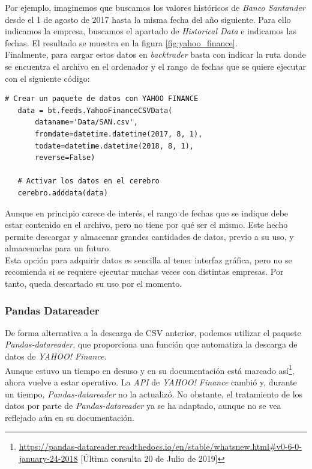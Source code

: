 		Por ejemplo, imaginemos que buscamos los valores hist\'oricos de \textit{Banco Santander} desde el 1 de agosto de 2017 hasta la misma fecha del a\~{n}o siguiente. Para ello indicamos la empresa, buscamos el apartado de \textit{Historical Data} e indicamos las fechas. El resultado se muestra en la figura \ref{fig:yahoo_finance}.\\
		
		Finalmente, para cargar estos datos en \textit{backtrader} basta con indicar la ruta donde se encuentra el archivo en el ordenador y el rango de fechas que se quiere ejecutar con el siguiente c\'odigo:\\
		

		\begin{lstlisting}[basicstyle=\tiny]
   # Crear un paquete de datos con YAHOO FINANCE
   data = bt.feeds.YahooFinanceCSVData(
	   dataname='Data/SAN.csv',
	   fromdate=datetime.datetime(2017, 8, 1),
	   todate=datetime.datetime(2018, 8, 1),
	   reverse=False)
   
   # Activar los datos en el cerebro
   cerebro.adddata(data)
		\end{lstlisting}

		Aunque en principio carece de inter\'es, el rango de fechas que se indique debe estar contenido en el archivo, pero no tiene por qu\'e ser el mismo. Este hecho permite descargar y almacenar grandes cantidades de datos, previo a su uso, y almacenarlas para un futuro.\\
		
		Esta opci\'on para adquirir datos es sencilla al tener interfaz gr\'afica, pero no se recomienda si se requiere ejecutar muchas veces con distintas empresas. Por tanto, queda descartado su uso por el momento.


    \subsubsection{Pandas Datareader}
    De forma alternativa a la descarga de CSV anterior, podemos utilizar el paquete \textit{Pandas-datareader}, que proporciona una funci\'on que automatiza la descarga de datos de \textit{YAHOO! Finance}.\\ 
    
    Aunque estuvo un tiempo en desuso y en su documentaci\'on est\'a marcado as\'i\footnote{\url{https://pandas-datareader.readthedocs.io/en/stable/whatsnew.html\#v0-6-0-january-24-2018} [\'Ultima consulta 20 de Julio de 2019]}, ahora vuelve a estar operativo. La \textit{API} de \textit{YAHOO! Finance} cambi\'o y, durante un tiempo, \textit{Pandas-datareader} no la actualiz\'o. No obstante, el tratamiento de los datos por parte de \textit{Pandas-datareader} ya se ha adaptado, aunque no se vea reflejado a\'un en su documentaci\'on.\\
    
